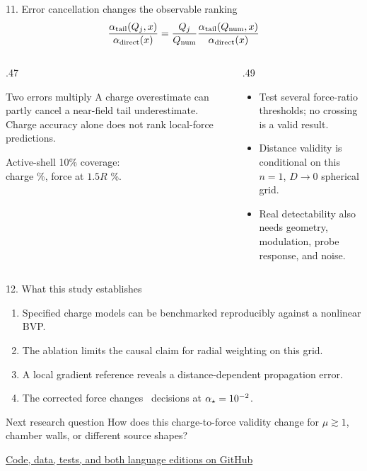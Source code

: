 \documentclass[10pt,aspectratio=169]{beamer}
\begin{document}
\begin{frame}{11. Error cancellation changes the observable ranking}
 \[\frac{\alpha_{\mathrm{tail}}(Q_j,x)}{\alpha_{\mathrm{direct}}(x)}=
   \frac{Q_j}{Q_{\mathrm{num}}}\frac{\alpha_{\mathrm{tail}}(Q_{\mathrm{num}},x)}{\alpha_{\mathrm{direct}}(x)}\]
 \begin{columns}[T,onlytextwidth]
 \begin{column}{.47\textwidth}
  \begin{block}{Two errors multiply}
   A charge overestimate can partly cancel a near-field tail underestimate.
   Charge accuracy alone does not rank local-force predictions.
  \end{block}
  \small Active-shell 10\% coverage:\\
  charge \StudyASWithin\%, force at $1.5R$ \StudyASLocalWithin\%.
 \end{column}
 \begin{column}{.49\textwidth}
  \small
  \begin{itemize}
   \item Test several force-ratio thresholds; no crossing is a valid result.
   \item Distance validity is conditional on this $n=1$, $D\to0$ spherical grid.
   \item Real detectability also needs geometry, modulation, probe response, and noise.
  \end{itemize}
 \end{column}
 \end{columns}
\end{frame}

\begin{frame}{12. What this study establishes}
 \begin{enumerate}
  \item Specified charge models can be benchmarked reproducibly against a nonlinear BVP.
  \item The ablation limits the causal claim for radial weighting on this grid.
  \item A local gradient reference reveals a distance-dependent propagation error.
  \item The corrected force changes \StudyTailFlips\ decisions at $\alpha_\star=10^{-2}$.
 \end{enumerate}
 \vspace{.2cm}
 \begin{block}{Next research question}
  How does this charge-to-force validity change for $\mu\gtrsim1$,
  chamber walls, or different source shapes?
 \end{block}
 \centering\small
 \href{https://github.com/Lasqui-Ponto/Mechanics_Term_Project/tree/agent/improve-chameleon-project/Thin_Shell_Study}{Code, data, tests, and both language editions on GitHub}
\end{frame}
\end{document}
